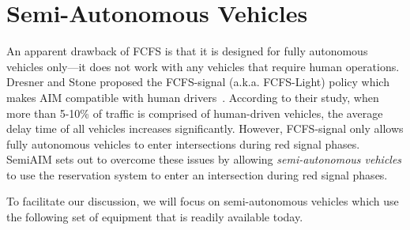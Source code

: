 \section{Semi-Autonomous Vehicles}
\label{sec:vehicles}

An apparent drawback of FCFS is that it is designed for fully autonomous
vehicles only---it does not work with any vehicles that require human
operations.
Dresner and Stone proposed the FCFS-signal (a.k.a. FCFS-Light) policy which makes AIM
compatible with human drivers~\cite{bib:Dresner07Sharing}. According
to their study, when more than 5-10\% of traffic is comprised of
human-driven vehicles, the average delay time of all vehicles
increases significantly.
However, FCFS-signal only allows fully autonomous
vehicles to enter intersections during red signal phases.
SemiAIM sets out to overcome these issues by allowing
\emph{semi-autonomous vehicles} to use the reservation system
to enter an intersection during red signal phases.

% 
To facilitate our discussion, we will focus on semi-autonomous
vehicles which use the following set of equipment that is readily
available today.

